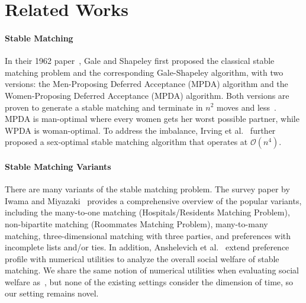\section{Related Works}
\paragraph{Stable Matching}
In their 1962 paper~\cite{galeshapley1962}, Gale and Shapeley first proposed the classical stable matching problem and the corresponding
Gale-Shapeley algorithm, with two versions: the Men-Proposing Deferred Acceptance (MPDA) algorithm and the Women-Proposing Deferred Acceptance (MPDA) algorithm. Both versions are proven to generate a stable matching and terminate in $n^2$ moves and less~\cite{irving1989textbook}. MPDA is man-optimal where every women gets her worst possible partner, while WPDA is woman-optimal. To address the imbalance, Irving et al.~\cite{irving1987efficient} further proposed a sex-optimal stable matching algorithm that operates at $\mathcal{O}(n^4)$.

\paragraph{Stable Matching Variants}
There are many variants of the stable matching problem. The survey paper by Iwama and Miyazaki~\cite{iwama2008survey} provides a comprehensive overview of the popular variants, including the many-to-one matching (Hospitals/Residents Matching Problem), non-bipartite matching (Roommates Matching Problem), many-to-many matching, three-dimensional matching with three parties, and preferences with incomplete lists and/or ties. In addition, Anshelevich et al.~\cite{Anshelevich2013} extend preference profile with numerical utilities to analyze the overall social welfare of stable matching. We share the same notion of numerical utilities when evaluating social welfare as~\cite{Anshelevich2013}, but none of the existing settings consider the dimension of time, so our setting remains novel.
